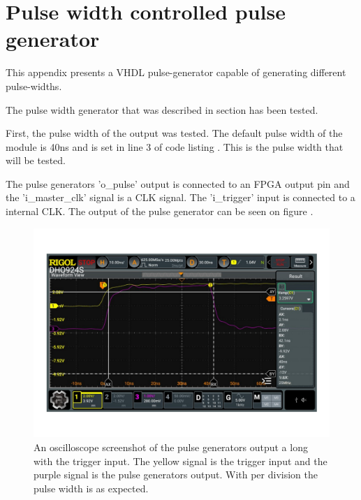 \chapter{Pulse width controlled pulse generator} \label{App:PWCPulseGen}
This appendix presents a VHDL pulse-generator capable of generating different pulse-widths.

The pulse width generator that was described in section  has been tested.

First, the pulse width of the output was tested. The default pulse width of the module is 40ns and is set in line 3 of code listing . This is the pulse width that will be tested.



The pulse generators 'o\_pulse' output is connected to an FPGA output pin and the 'i\_master\_clk' signal is a  CLK signal. The 'i\_trigger' input is connected to a  internal CLK. The output of the pulse generator can be seen on figure .

\begin{figure}[H]
    \centering
    \includegraphics[clip, trim=0 50 0 50, width=1\textwidth]{Appendix/Figures/A_PulseWidthGen_PulseWidth.pdf}
    \caption{An oscilloscope screenshot of the pulse generators output a long with the trigger input. The yellow signal is the trigger input and the purple signal is the pulse generators output. With  per division the pulse width is  as expected.}
    \label{fig:A_PulseGenWidth_WidthTest}
\end{figure}

